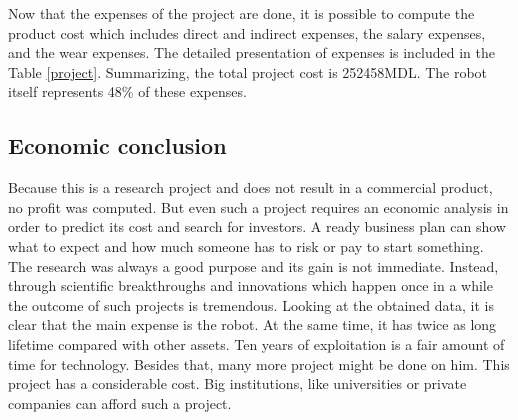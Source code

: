 		Now that the expenses of the project are done, it is possible to compute the product cost which includes direct and indirect expenses, the salary expenses, and the wear expenses. The detailed presentation of expenses is included in the Table \ref{project}. Summarizing, the total project cost is 252458MDL. The robot itself represents 48\% of these expenses.

  		\subsection{Economic conclusion}
  		
  		Because this is a research project and does not result in a commercial product, no profit was computed. But even such a project requires an economic analysis in order to predict its cost and search for investors. A ready business plan can show what to expect and how much someone has to risk or pay to start something. The research was always a good purpose and its gain is not immediate. Instead, through scientific breakthroughs and innovations which happen once in a while the outcome of such projects is tremendous. Looking at the obtained data, it is clear that the main expense is the robot. At the same time, it has twice as long lifetime compared with other assets. Ten years of exploitation is a fair amount of time for technology. Besides that, many more project might be done on him. This project has a considerable cost. Big institutions, like universities or private companies can afford such a project.

\clearpage